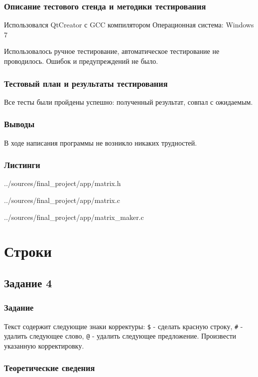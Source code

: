 \documentclass[12pt,a4paper]{report}
\begin{document}
\subsection{Описание тестового стенда и методики тестирования}
Использовался QtCreator с GCC компилятором
Операционная система: Windows 7


Использовалось ручное тестирование, автоматическое тестирование не проводилось.
Ошибок и предупреждений не было.

\subsection{Тестовый план и результаты тестирования}
Все тесты были пройдены успешно: полученный результат, совпал с ожидаемым.


\subsection{Выводы}

В ходе написания программы не возникло никаких трудностей.

\subsection*{Листинги}

{../sources/final_project/app/matrix.h}

{../sources/final_project/app/matrix.c}

{../sources/final_project/app/matrix_maker.c}

\chapter{Строки}

\section{Задание 4}

\subsection{Задание}

Текст содержит следующие знаки корректуры: \verb-$- - сделать красную строку, \verb-#- - удалить следующее слово, \verb-@- - удалить следующее предложение. Произвести указанную корректировку.

\subsection{Теоретические сведения}
\end{document}
